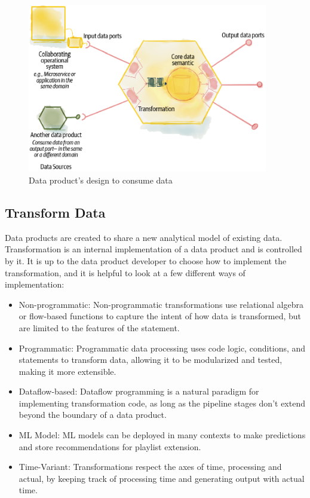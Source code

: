 \documentclass[12pt, a4paper]{book}
\begin{document}
\begin{figure}[ht]
	\begin{framed}
		\centering
		\includegraphics[width=10.5cm]{ConsumeData.png}
		\caption{Data product’s design to consume data}
		\label{ConsumeData}
	\end{framed}
	\vspace{-1cm}
\end{figure}

\subsection{Transform Data}
Data products are created to share a new analytical model of existing data. Transformation is an internal implementation of a data product and is controlled by it. It is up to the data product developer to choose how to implement the transformation, and it is helpful to look at a few different ways of implementation:
	\begin{itemize}[nosep]
		\item Non-programmatic: Non-programmatic transformations use relational algebra or flow-based functions to capture the intent of how data is transformed, but are limited to the features of the statement.
		\item Programmatic: Programmatic data processing uses code logic, conditions, and statements to transform data, allowing it to be modularized and tested, making it more extensible.
		\item Dataflow-based: Dataflow programming is a natural paradigm for implementing transformation code, as long as the pipeline stages don't extend beyond the boundary of a data product.
		\item ML Model: ML models can be deployed in many contexts to make predictions and store recommendations for playlist extension.
		\item Time-Variant: Transformations respect the axes of time, processing and actual, by keeping track of processing time and generating output with actual time.
	\end{itemize}
\end{document}
